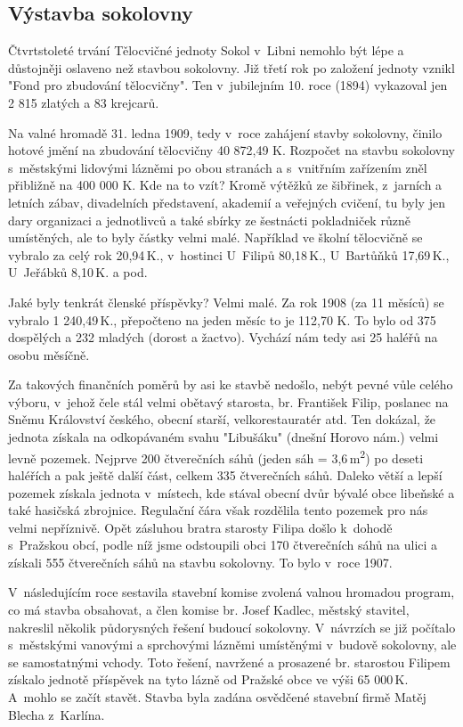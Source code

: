 \documentclass[a5paper, 11pt, twoside]{article}
\begin{document}
\subsection{Výstavba sokolovny}

Čtvrtstoleté trvání Tělocvičné jednoty Sokol v~Libni nemohlo být lépe a
důstojněji oslaveno než stavbou sokolovny. Již třetí rok po založení
jednoty vznikl "Fond pro zbudování tělocvičny". Ten v~jubilejním 10.
roce (1894) vykazoval jen 2 815 zlatých a 83 krejcarů.

Na valné hromadě 31. ledna 1909, tedy v~roce zahájení stavby sokolovny,
činilo hotové jmění na zbudování tělocvičny 40 872,49 K. Rozpočet na
stavbu sokolovny s~městskými lidovými lázněmi po obou stranách a
s~vnitřním zařízením zněl přibližně na 400 000 K. Kde na to vzít? Kromě
výtěžků ze šibřinek, z~jarních a letních zábav, divadelních představení,
akademií a veřejných cvičení, tu byly jen dary organizaci a jednotlivců
a také sbírky ze šestnácti pokladniček různě umístěných, ale to byly
částky velmi malé. Například ve školní tělocvičně se vybralo za celý rok
20,94\,K., v~hostinci U~Filipů 80,18\,K., U~Bartůňků 17,69\,K., U~Jeřábků
8,10\,K. a pod.

Jaké byly tenkrát členské příspěvky? Velmi malé. Za rok 1908 (za 11
měsíců) se vybralo 1 240,49\,K., přepočteno na jeden měsíc to je 112,70
K. To bylo od 375 dospělých a 232 mladých (dorost a žactvo). Vychází nám
tedy asi 25 haléřů na osobu měsíčně.

Za takových finančních poměrů by asi ke stavbě nedošlo, nebýt pevné vůle
celého výboru, v~jehož čele stál velmi obětavý starosta, br. František
Filip, poslanec na Sněmu Království českého, obecní starší,
velkorestauratér atd. Ten dokázal, že jednota získala na odkopávaném
svahu "Libušáku" (dnešní Horovo nám.) velmi levně pozemek. Nejprve 200
čtverečních sáhů (jeden sáh = 3,6\,m\textsuperscript{2}) po deseti
haléřích a pak ještě další část, celkem 335 čtverečních sáhů. Daleko
větší a lepší pozemek získala jednota v~místech, kde stával obecní dvůr
bývalé obce libeňské a také hasičská zbrojnice. Regulační čára však
rozdělila tento pozemek pro nás velmi nepříznivě. Opět zásluhou bratra
starosty Filipa došlo k~dohodě s~Pražskou obcí, podle níž jsme
odstoupili obci 170 čtverečních sáhů na ulici a získali 555 čtverečních
sáhů na stavbu sokolovny. To bylo v~roce 1907.

V~následujícím roce sestavila stavební komise zvolená valnou hromadou
program, co má stavba obsahovat, a člen komise br. Josef Kadlec, městský
stavitel, nakreslil několik půdorysných řešení budoucí sokolovny.
V~návrzích se již počítalo s~městskými vanovými a sprchovými lázněmi
umístěnými v~budově sokolovny, ale se samostatnými vchody. Toto řešení,
navržené a prosazené br. starostou Filipem získalo jednotě příspěvek na
tyto lázně od Pražské obce ve výši 65 000\,K. A~mohlo se začít stavět.
Stavba byla zadána osvědčené stavební firmě Matěj Blecha z~Karlína.
\end{document}
